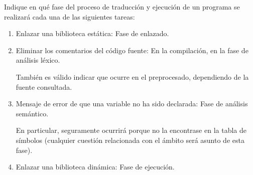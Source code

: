 \begin{ejercicio}\label{ej:3.Ejercicio14}
    Indique en qué fase del proceso de traducción y ejecución de un programa se realizará cada una de las siguientes tareas:

    \begin{enumerate}
        \item Enlazar una biblioteca estática: Fase de enlazado.
        \item Eliminar los comentarios del código fuente: En la compilación, en la fase de análisis léxico.
        
        También es válido indicar que ocurre en el preprocesado, dependiendo de la fuente consultada.
        \item Mensaje de error de que una variable no ha sido declarada: Fase de análisis semántico.
        
        En particular, seguramente ocurrirá porque no la encontrase en la tabla de símbolos (cualquier cuestión relacionada con el ámbito será asunto de esta fase).
        \item Enlazar una biblioteca dinámica: Fase de ejecución. 
    \end{enumerate}
\end{ejercicio}

